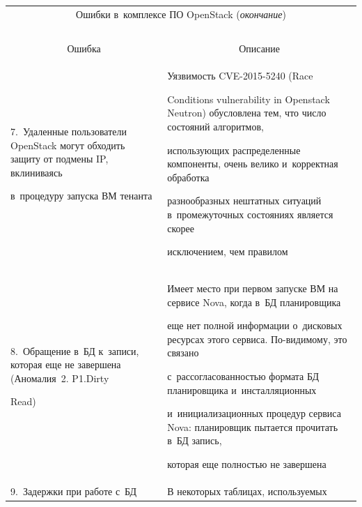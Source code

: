 \begin{table}\small


  \begin{center}


  \label{e1}


  


  \begin{tabular}{|p{30mm}|p{91mm}|}


  \multicolumn{2}{c}{Ошибки в~комплексе ПО OpenStack (\textit{окончание})}\\


  \multicolumn{2}{c}{\ }\\[-6pt]


  \hline


\multicolumn{1}{|c|}{Ошибка}&\multicolumn{1}{c|}{Описание}\\


\hline


7.~Удаленные пользователи OpenStack могут обходить защиту от подмены IP, вклиниваясь 


в~процедуру запуска ВМ тенанта~\cite{9-g7}&Уязвимость CVE-2015-5240 (Race 


Conditions vulnerability in Openstack Neutron) обусловлена тем, что число состояний алгоритмов, 


использующих распределенные компоненты, очень велико и~корректная обработка 


разнообразных нештатных ситуаций в~промежуточных состояниях является скорее 


исключением, чем правилом\\


\hline


8.~Обращение в~БД к~записи, которая еще не завершена~\cite{10-g7} (Аномалия~2. P1.Dirty 


Read)


&Имеет место при первом запуске ВМ на сервисе Nova, когда в~БД планировщика 


еще нет полной информации о~дисковых ресурсах этого сервиса. По-видимому, это связано 


с~рассогласованностью формата БД планировщика и~инсталляционных 


и~инициализационных процедур сервиса Nova: планировщик пытается прочитать в~БД запись, 


которая еще полностью не завершена \\


\hline


9.~Задержки при работе с~БД~\cite{11-g7}&В некоторых таблицах, используемых 



\end{tabular}
\end{center}
\end{table}
